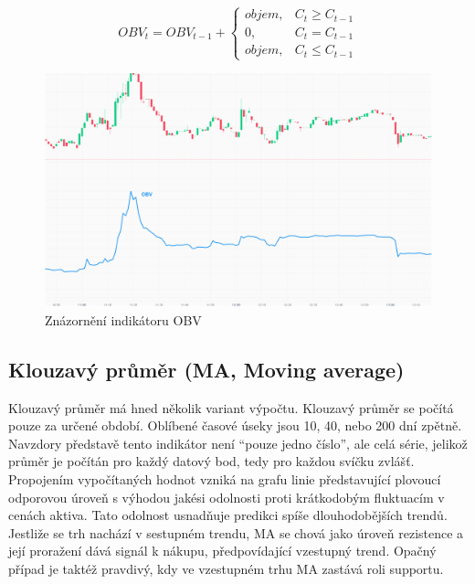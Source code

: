 \begin{equation}
    OBV_t = OBV_{t-1} +
    \begin{cases}
        objem, & C_t \ge C_{t-1} \\
        0,     & C_t = C_{t-1}   \\
        objem, & C_t \le C_{t-1}
    \end{cases}
    \label{eq:obv}
\end{equation}

\begin{figure}[h]
    \centering
    \includegraphics[width=1\textwidth]{Figures/OBV.pdf}
    \caption{Znázornění indikátoru OBV}
    \label{fig:obv}
\end{figure}

\subsection{Klouzavý průměr (MA, Moving average)}
Klouzavý průměr má hned několik variant výpočtu. Klouzavý průměr se počítá pouze za určené období. Oblíbené časové úseky jsou 10, 40, nebo 200 dní zpětně.
Navzdory představě tento indikátor není \enquote{pouze jedno číslo}, ale celá série, jelikož průměr je počítán pro každý datový bod, tedy pro každou svíčku zvlášť. Propojením vypočítaných
hodnot vzniká na grafu linie představující plovoucí odporovou úroveň s výhodou jakési odolnosti proti krátkodobým fluktuacím v cenách aktiva. Tato odolnost usnadňuje predikci spíše dlouhodobějších trendů.
Jestliže se trh nachází v sestupném trendu, MA se chová jako úroveň rezistence a její proražení dává signál k nákupu, předpovídající vzestupný trend.
Opačný případ je taktéž pravdivý, kdy ve vzestupném trhu MA zastává roli supportu.

